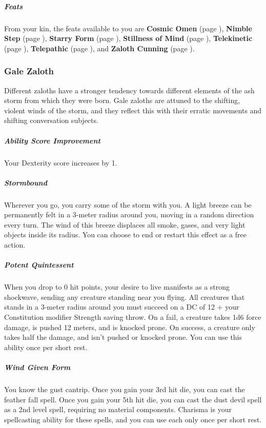     \subparagraph{Feats} From your kin, the feats available to you are
    \textbf{Cosmic Omen} (page \pageref{feat::cosmicomen}),
    \textbf{Nimble Step} (page \pageref{feat::nimblestep}),
    \textbf{Starry Form} (page \pageref{feat::starryform}),
    \textbf{Stillness of Mind} (page \pageref{feat::stillnessofmind}),
    \textbf{Telekinetic} (page \pageref{feat::telekinetic}),
    \textbf{Telepathic} (page \pageref{feat::telepathic}), and
    \textbf{Zaloth Cunning} (page \pageref{feat::zalothcunning}).

\subsubsection{Gale Zaloth}
    Different zaloths have a stronger tendency towards different elements of the ash storm from which they were born.
    Gale zaloths are attuned to the shifting, violent winds of the storm, and they reflect this with their erratic movements and shifting conversation subjects.

    \subparagraph{Ability Score Improvement} Your Dexterity score increases by 1.

    \subparagraph{Stormbound} Wherever you go, you carry some of the storm with you.
    A light breeze can be permanently felt in a 3-meter radius around you, moving in a random direction every turn.
    The wind of this breeze displaces all smoke, gases, and very light objects inside its radius.
    You can choose to end or restart this effect as a free action.

    \subparagraph{Potent Quintessent} When you drop to 0 hit points, your desire to live manifests as a strong shockwave, sending any creature standing near you flying.
    All creatures that stands in a 3-meter radius around you must succeed on a DC of 12 + your Constitution modifier Strength saving throw.
    On a fail, a creature takes 1d6 force damage, is pushed 12 meters, and is knocked prone.
    On success, a creature only takes half the damage, and isn't pushed or knocked prone.
    You can use this ability once per short rest.

    \subparagraph{Wind Given Form} You know the gust cantrip.
    Once you gain your 3rd hit die, you can cast the feather fall spell.
    Once you gain your 5th hit die, you can cast the dust devil spell as a 2nd level spell, requiring no material components.
    Charisma is your spellcasting ability for these spells, and you can use each only once per short rest.

